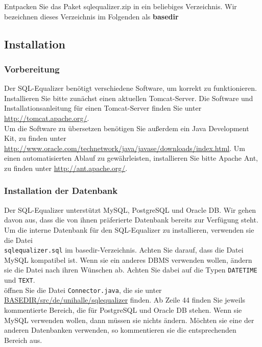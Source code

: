 \documentclass[12pt]{scrreprt}
\theoremstyle{remark}
\begin{document}
Entpacken Sie das Paket sqlequalizer.zip in ein beliebiges Verzeichnis. Wir bezeichnen dieses Verzeichnis im Folgenden als \textbf{basedir}\\

\subsection{Installation}

\subsubsection{Vorbereitung}

Der SQL-Equalizer benötigt verschiedene Software, um korrekt zu funktionieren. Installieren Sie bitte zunächst einen aktuellen Tomcat-Server. Die Software und Installationsanleitung für einen Tomcat-Server finden Sie unter \url{http://tomcat.apache.org/}.\\

Um die Software zu übersetzen benötigen Sie außerdem ein Java Development Kit, zu finden unter \url{http://www.oracle.com/technetwork/java/javase/downloads/index.html}. Um einen automatisierten Ablauf zu gewährleisten, installieren Sie bitte Apache Ant, zu finden unter \url{http://ant.apache.org/}.\\

\subsubsection{Installation der Datenbank}

Der SQL-Equalizer unterstützt MySQL, PostgreSQL und Oracle DB. Wir gehen davon aus, dass die von ihnen präferierte Datenbank bereits zur Verfügung steht.\\

Um die interne Datenbank für den SQL-Equalizer zu installieren, verwenden sie die Datei\\\verb|sqlequalizer.sql| im basedir-Verzeichnis. Achten Sie darauf, dass die Datei MySQL kompatibel ist. Wenn sie ein anderes DBMS verwenden wollen, ändern sie die Datei nach ihren Wünschen ab. Achten Sie dabei auf die Typen \verb|DATETIME| und \verb|TEXT|.\\

öffnen Sie die Datei \verb|Connector.java|, die sie unter \url{BASEDIR/src/de/unihalle/sqlequalizer} finden. Ab Zeile 44 finden Sie jeweils kommentierte Bereich, die für PostgreSQL und Oracle DB stehen. Wenn sie MySQL verwenden wollen, dann müssen sie nichts ändern. Möchten sie eine der anderen Datenbanken verwenden, so kommentieren sie die entsprechenden Bereich aus.\\
\end{document}
